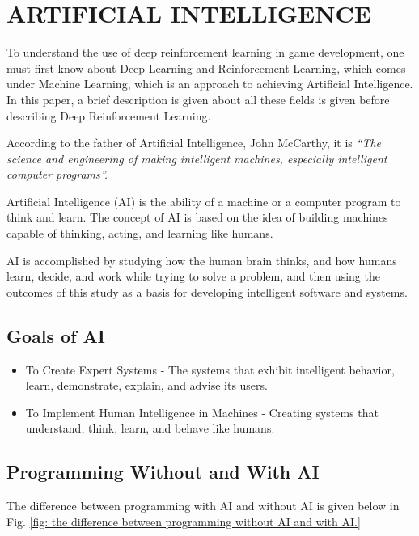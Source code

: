 \documentclass{article}
\begin{document}
\section{ARTIFICIAL INTELLIGENCE}
To understand the use of deep reinforcement learning in game development, one must first know about Deep Learning and Reinforcement Learning, which comes under Machine Learning, which is an approach to achieving Artificial Intelligence. In this paper, a brief description is given about all these fields is given before describing Deep Reinforcement Learning.

According to the father of Artificial Intelligence, John McCarthy, it is \textit{“The science and engineering of making intelligent machines, especially intelligent computer programs”.}

Artificial Intelligence (AI) is the ability of a machine or a computer program to think and learn. The concept of AI is based on the idea of building machines capable of thinking, acting, and learning like humans.

AI is accomplished by studying how the human brain thinks, and how humans learn, decide, and work while trying to solve a problem, and then using the outcomes of this study as a basis for developing intelligent software and systems.
\subsection{Goals of AI}

\begin{itemize}
\item To Create Expert Systems - The systems that exhibit intelligent behavior, learn, demonstrate, explain, and advise its users.
\item To Implement Human Intelligence in Machines - Creating systems that understand, think, learn, and behave like humans.
\end{itemize}

\subsection{Programming Without and With AI}
The difference between programming with AI and without AI is given below in Fig. \ref{fig: the difference between programming without AI and with AI.}
\end{document}
